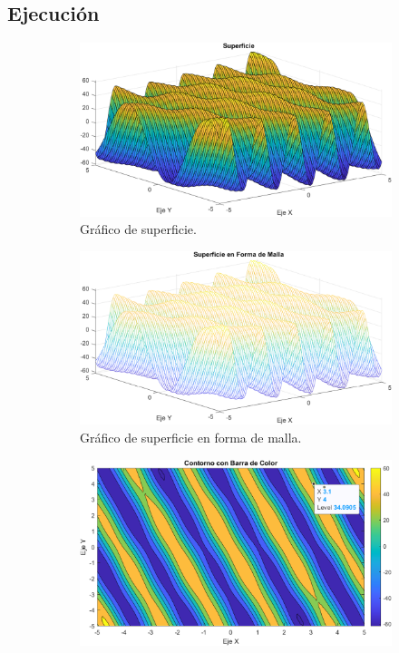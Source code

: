 \documentclass[a4paper, 12pt]{article}
\begin{document}
	\subsection{Ejecución}
	\begin{figure}[ht]
		\begin{subfigure}{0.49\textwidth}
			\centering
			\includegraphics[width=\textwidth]{figures/graf5.1.png}
			\caption{Gráfico de superficie.}
			\label{grafica5.1}
		\end{subfigure}
		\begin{subfigure}{0.49\textwidth}
			\centering
			\includegraphics[width=\textwidth]{figures/graf5.2.png}
			\caption{Gráfico de superficie en forma de malla.}
			\label{grafica5.2}
		\end{subfigure}
		\begin{subfigure}{0.49\textwidth}
			\centering
			\includegraphics[width=\textwidth]{figures/graf5.3.png}

\end{subfigure}
\end{figure}
\end{document}
